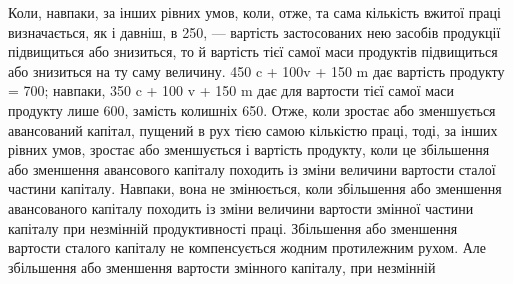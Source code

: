 Коли, навпаки, за інших рівних умов, коли, отже, та сама кількість
вжитої праці визначається, як і давніш, в 250, — вартість застосованих нею
засобів продукції підвищиться або знизиться, то й вартість тієї самої маси продуктів
підвищиться або знизиться на ту саму величину. 450 c + 100v + 150  m
дає вартість продукту = 700; навпаки, 350 c + 100 v + 150 m дає для вартости
тієї самої маси продукту лише 600, замість колишніх 650. Отже, коли зростає
або зменшується авансований капітал, пущений в рух тією самою кількістю
праці, тоді, за інших рівних умов, зростає або зменшується і вартість продукту,
коли це збільшення або зменшення авансового капіталу походить із зміни
величини вартости сталої частини капіталу. Навпаки, вона не змінюється, коли
збільшення або зменшення авансованого капіталу походить із зміни величини
вартости змінної частини капіталу при незмінній продуктивності праці. Збільшення
або зменшення вартости сталого капіталу не компенсується жодним протилежним
рухом. Але збільшення або зменшення вартости змінного капіталу, при незмінній
\parbreak{}  %
